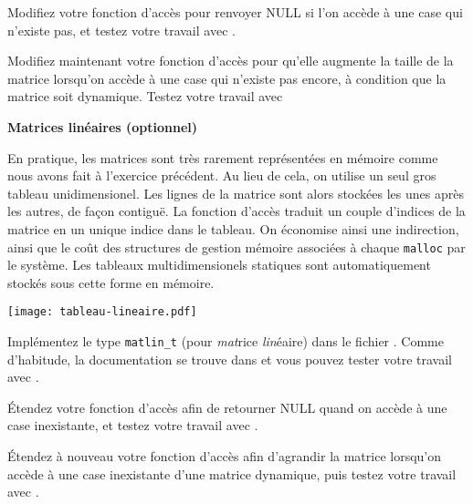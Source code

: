 \documentclass[10pt]{article}\usepackage[enonce]{exemptty}
\begin{document}
\begin{Exercice}
  \Question Modifiez votre fonction d'accès pour renvoyer NULL si
  l'on accède à une case qui n'existe pas, et testez votre travail
  avec .

  \Question Modifiez maintenant votre fonction d'accès pour qu'elle
  augmente la taille de la matrice lorsqu'on accède à une case qui
  n'existe pas encore, à condition que la matrice soit
  dynamique. Testez votre travail avec 
  
\end{Exercice}


\medskip
\begin{Exercice} \textbf{Matrices linéaires (optionnel)} 

  En pratique, les matrices sont très rarement représentées en mémoire
  comme nous avons fait à l'exercice précédent. Au lieu de cela, on
  utilise un seul gros tableau unidimensionel. Les lignes de la
  matrice sont alors stockées les unes après les autres, de façon
  contiguë. La fonction d'accès traduit un couple d'indices de la
  matrice en un unique indice dans le tableau.
%
  On économise ainsi une indirection, ainsi que le coût des structures
  de gestion mémoire associées à chaque \texttt{malloc} par le
  système.  Les tableaux multidimensionels statiques sont
  automatiquement stockés sous cette forme en mémoire.

  \centerline{\texttt{[image: tableau-lineaire.pdf]}}

  \Question Implémentez le type \texttt{matlin\_t} (pour
  \textit{mat}rice \textit{lin}éaire) dans le fichier
  . Comme d'habitude, la documentation se trouve dans
   et vous pouvez tester votre travail avec
  .

  \Question Étendez votre fonction d'accès afin de retourner NULL
  quand on accède à une case inexistante, et testez votre travail avec
  .

  \Question Étendez à nouveau votre fonction d'accès afin d'agrandir
  la matrice lorsqu'on accède à une case inexistante d'une matrice
  dynamique, puis testez votre travail avec .
\end{Exercice}
\end{document}
